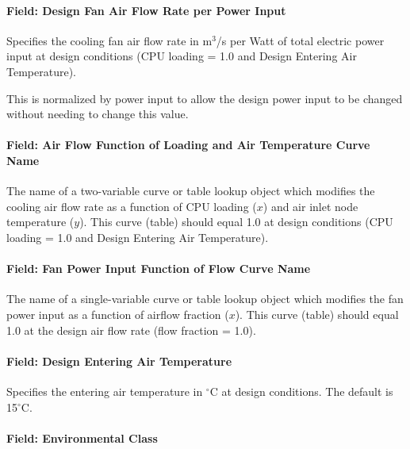 \paragraph{Field: Design Fan Air Flow Rate per Power Input}\label{field-design-fan-air-flow-rate-per-power-input}

Specifies the cooling fan air flow rate in m$^3$/s per Watt of total electric power input at design conditions (CPU loading = 1.0 and Design Entering Air Temperature).

This is normalized by power input to allow the design power input to be changed without needing to change this value.

\paragraph{Field: Air Flow Function of Loading and Air Temperature Curve Name}\label{field-air-flow-function-of-loading-and-air-temperature-curve-name}

The name of a two-variable curve or table lookup object which modifies the cooling air flow rate as a function of CPU loading ($x$) and air inlet node temperature ($y$). This curve (table) should equal 1.0 at design conditions (CPU loading = 1.0 and Design Entering Air Temperature).

\paragraph{Field: Fan Power Input Function of Flow Curve Name}\label{field-fan-power-input-function-of-flow-curve-name}

The name of a single-variable curve or table lookup object which modifies the fan power input as a function of airflow fraction ($x$). This curve (table) should equal 1.0 at the design air flow rate (flow fraction = 1.0).

\paragraph{Field: Design Entering Air Temperature}\label{field-design-entering-air-temperature}

Specifies the entering air temperature in $^\circ$C at design conditions. The default is 15$^\circ$C.

\paragraph{Field: Environmental Class}\label{field-environmental-class}

